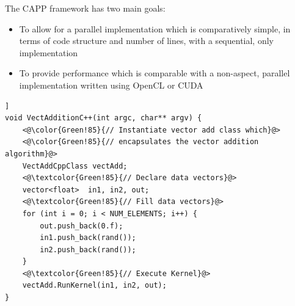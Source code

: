\documentclass{sig-alternate-05-2015}
\begin{document}
The  CAPP framework has two main goals:
\begin{itemize}
	\item{To allow for a parallel implementation 
			which is comparatively simple, in terms of code structure and number
			of lines, with a sequential, \CPP only implementation
		}
	\item{To provide performance which is comparable with a non-aspect, parallel
			implementation written using OpenCL or CUDA
		}
\end{itemize}


\begin{lstlisting}[caption=Vector addition on the host using
\CPP.,label=vectcpp,float=[t!]]
void VectAdditionC++(int argc, char** argv) {
	<@\color{Green!85}{// Instantiate vector add class which}@>
	<@\color{Green!85}{// encapsulates the vector addition algorithm}@>
	VectAddCppClass vectAdd;
	<@\textcolor{Green!85}{// Declare data vectors}@>
	vector<float>  in1, in2, out;
	<@\textcolor{Green!85}{// Fill data vectors}@>
	for (int i = 0; i < NUM_ELEMENTS; i++) {
		out.push_back(0.f);
		in1.push_back(rand());
		in2.push_back(rand());
	}
	<@\textcolor{Green!85}{// Execute Kernel}@>
	vectAdd.RunKernel(in1, in2, out);
}
\end{lstlisting}
\end{document}
